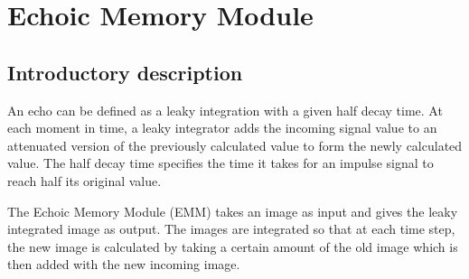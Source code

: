 \newpage
\section{Echoic Memory Module}

\hypertarget{Concepts:EchoicMemoryModule}{}

\hypertarget{Concepts:IPEMLeakyIntegration}{}

\subsection{Introductory description}

An echo can be defined as a leaky integration with a given half
decay time. At each moment in time, a leaky integrator adds the
incoming signal value to an attenuated version of the previously
calculated value to form the newly calculated value. The half
decay time specifies the time it takes for an impulse signal to
reach half its original value.

The Echoic Memory Module (EMM) takes an image as input and gives
the leaky integrated image as output. The images are integrated so
that at each time step, the new image is calculated by taking a
certain amount of the old image which is then added with the new
incoming image.

